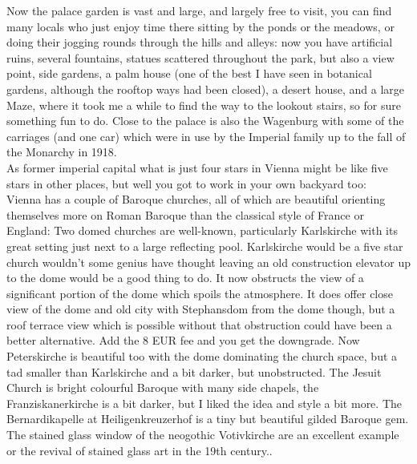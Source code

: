 Now the palace garden is vast and large, and largely free to visit, you can find many locals who just enjoy time there sitting by the ponds or the meadows, or doing their jogging rounds through the hills and alleys: now you have artificial ruins, several fountains, statues scattered throughout the park, but also a view point, side gardens, a palm house (one of the best I have seen in botanical gardens, although the rooftop ways had been closed), a desert house, and a large Maze, where it took me a while to find the way to the lookout stairs, so for sure something fun to do. Close to the palace is also the Wagenburg with some of the carriages (and one car) which were in use by the Imperial family up to the fall of the Monarchy in 1918.\\

As former imperial capital what is just four stars in Vienna might be like five stars in other places, but well you got to work in your own backyard too:\\
Vienna has a couple of Baroque churches, all of which are beautiful orienting themselves more on Roman Baroque than the classical style of France or England: Two domed churches are well-known, particularly Karlskirche with its great setting just next to a large reflecting pool. Karlskirche would be a five star church wouldn't some genius have thought leaving an old construction elevator up to the dome would be a good thing to do. It now obstructs the view of a significant portion of the dome which spoils the atmosphere. It does offer close view of the dome and old city with Stephansdom from the dome though, but a roof terrace view which is possible without that obstruction could have been a better alternative. Add the 8 EUR fee and you get the downgrade. Now Peterskirche is beautiful too with the dome dominating the church space, but a tad smaller than Karlskirche and a bit darker, but unobstructed. The Jesuit Church is bright colourful Baroque with many side chapels, the Franziskanerkirche is a bit darker, but I liked the idea and style a bit more. The Bernardikapelle at Heiligenkreuzerhof is a tiny but beautiful gilded Baroque gem. The stained glass window of the neogothic Votivkirche are an excellent example or the revival of stained glass art in the 19th century..\\
